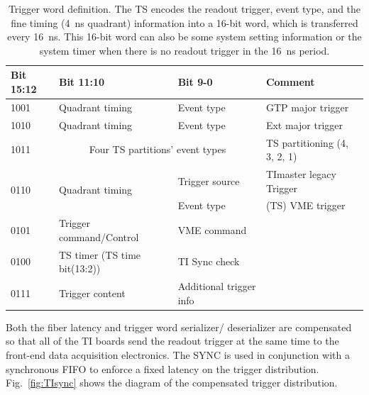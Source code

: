 \begin{table}
\begin{adjustbox}{width=\columnwidth,center}
	\begin{tabular}{| l | l | l | l |}
		\hline \hline
		Bit 15:12		& 	Bit 11:10 &	Bit 9-0	 & Comment		\\
		\hline
	1001	& Quadrant timing	& Event type	 & GTP major trigger \\
	1010	& Quadrant timing	& Event type	 & Ext major trigger \\
	
	1011	& \multicolumn{2}{c}{Four TS partitions’ event types}  & TS partitioning (4, 3, 2, 1)  \\

	\multirow{2}{*}{0110}	& \multirow{2}{*}{Quadrant timing}	& Trigger source & TImaster legacy Trigger \\
		    &                   & Event type	 & (TS) VME trigger     \\
	0101	& Trigger command/Control	& VME command & \\
	0100	& TS timer (TS time bit(13:2))	& TI Sync check & \\
	0111	& Trigger content	& Additional trigger info & \\
		\hline \hline
	\end{tabular}
\end{adjustbox}
\caption{Trigger word definition.  The TS encodes the readout trigger, event type, and the fine timing (4~ns quadrant) information into a 16-bit word, which is transferred every 16~ns.  This 16-bit word can also be some system setting information or the system timer when there is no readout trigger in the 16~ns period.}
\label{tab:trigger_word_definition}
\end{table}

Both the fiber latency and trigger word serializer/ deserializer are compensated so that all of the TI boards send the readout trigger at the same time to the front-end data acquisition electronics.  The SYNC is used in conjunction with a synchronous FIFO to enforce a fixed latency on the trigger distribution. Fig.~\ref{fig:TIsync} shows the diagram of the compensated trigger distribution.

